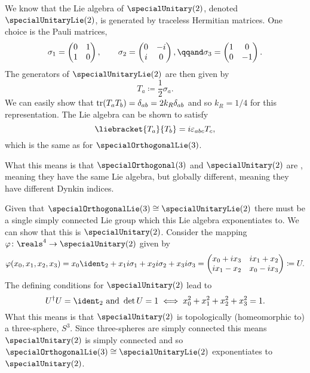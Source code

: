 We know that the Lie algebra of \(\specialUnitary(2)\), denoted \(\specialUnitaryLie(2)\), is generated by traceless Hermitian matrices.
One choice is the Pauli matrices,
\begin{equation}
    \sigma_1 = 
    \begin{pmatrix}
        0 & 1\\
        1 & 0
    \end{pmatrix}
    , \qquad \sigma_2 = 
    \begin{pmatrix}
        0 & -i\\
        i & 0
    \end{pmatrix}
    , \qqand \sigma_3 = 
    \begin{pmatrix}
        1 & 0\\
        0 & -1
    \end{pmatrix}
    .
\end{equation}
The generators of \(\specialUnitaryLie(2)\) are then given by
\begin{equation}
    T_a \coloneqq \frac{1}{2}\sigma_a.
\end{equation}
We can easily show that \(\operatorname{tr}(T_aT_b) = \delta_{ab} = 2k_R\delta_{ab}\) and so \(k_R = 1/4\) for this representation.
The Lie algebra can be shown to satisfy
\begin{equation}
    \liebracket{T_a}{T_b} = i\varepsilon_{abc}T_c,
\end{equation}
which is the same as for \(\specialOrthogonalLie(3)\).

What this means is that \(\specialOrthogonal(3)\) and \(\specialUnitary(2)\) are , meaning they have the same Lie algebra, but globally different, meaning they have different Dynkin indices.

Given that \(\specialOrthogonalLie(3) \isomorphic \specialUnitaryLie(2)\) there must be a single simply connected Lie group which this Lie algebra exponentiates to.
We can show that this is \(\specialUnitary(2)\).
Consider the mapping \(\varphi \colon \reals^4 \to \specialUnitary(2)\) given by
\begin{equation}
    \varphi(x_0, x_1, x_2, x_3) = x_0\ident_2 + x_1 i\sigma_1 + x_2 i\sigma_2 + x_3 i\sigma_3 = 
    \begin{pmatrix}
        x_0 + ix_3 & ix_1 + x_2\\
        ix_1 - x_2 & x_0 - ix_3
    \end{pmatrix}
    \coloneqq U.
\end{equation}
The defining conditions for \(\specialUnitary(2)\) lead to
\begin{equation}
    U^\hermit U = \ident_2 \text{ and } \det U = 1 \iff x_0^2 + x_1^2 + x_2^2 + x_3^2 = 1.
\end{equation}
What this means is that \(\specialUnitary(2)\) is topologically (homeomorphic to) a three-sphere, \(S^3\).
Since three-spheres are simply connected this means \(\specialUnitary(2)\) is simply connected and so \(\specialOrthogonalLie(3) \isomorphic \specialUnitaryLie(2)\) exponentiates to \(\specialUnitary(2)\).

